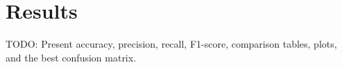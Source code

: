 \section{Results}

TODO: Present accuracy, precision, recall, F1-score, comparison tables, plots, and the best confusion matrix.
